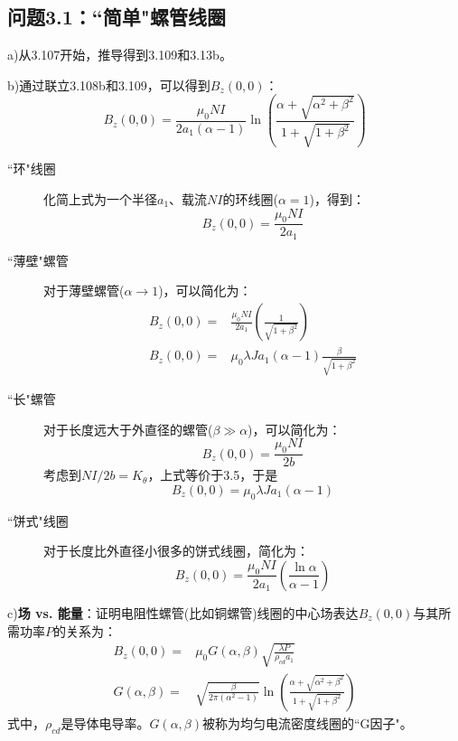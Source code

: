 \subsection{问题3.1：``简单"螺管线圈}
a)从3.107开始，推导得到3.109和3.13b。

b)通过联立3.108b和3.109，可以得到$B_z(0,0)$：
\begin{equation}
B_z(0,0)=\frac{\mu_0NI}{2a_1(\alpha-1)}\ln\left(\frac{\alpha+\sqrt{\alpha^2+\beta^2}}{1+\sqrt{1+\beta^2}}\right)%
\end{equation}

\begin{description}
  \item[``环"线圈] 化简上式为一个半径$a_1$、载流$NI$的环线圈($\alpha=1$)，得到：
  \begin{equation}
    B_z(0,0)=\frac{\mu_0NI}{2a_1}%
  \end{equation}
 \item[``薄壁"螺管] 对于薄壁螺管($\alpha \rightarrow 1$)，可以简化为：
 \begin{align*}
   B_z(0,0)=&\frac{\mu_0NI}{2a_1}\left(\frac{1}{\sqrt{1+\beta^2}}\right)\tag{3.111b}\\ %
   B_z(0,0)=&\mu_0 \lambda Ja_1(\alpha-1)\frac{\beta}{\sqrt{1+\beta^2}}\tag{3.111c}%
 \end{align*}
  \item[``长"螺管] 对于长度远大于外直径的螺管($\beta \gg \alpha$)，可以简化为：
\begin{equation*}
B_z(0,0)=\frac{\mu_0NI}{2b} \tag{3.111d}%
\end{equation*}
考虑到$NI/2b=K_\theta$，上式等价于3.5，于是
\begin{equation*}
B_z(0,0)=\mu_0\lambda Ja_1(\alpha-1) \tag{3.111e}%
\end{equation*}
  \item[``饼式"线圈] 对于长度比外直径小很多的饼式线圈，简化为：
  \begin{equation*}
B_z(0,0)=\frac{\mu_0NI}{2a_1}(\frac{\ln\alpha}{\alpha-1}) \tag{3.111f}%
  \end{equation*}
\end{description}

c)\textbf{场 vs. 能量}：证明电阻性螺管(比如铜螺管)线圈的中心场表达$B_z(0,0)$与其所需功率$P$的关系为：
\begin{subequations}
	\begin{align}
B_z(0,0)=&\mu_0G(\alpha,\beta)\sqrt{\frac{\lambda P}{\rho_{cd}a_1}}\\ %
G(\alpha,\beta)=&\sqrt{\frac{\beta}{2\pi(\alpha^2-1)}}\ln(\frac{\alpha+\sqrt{\alpha^2+\beta^2}}{1+\sqrt{1+\beta^2}})%
	\end{align}
\end{subequations}
式中，$\rho_{cd}$是导体电导率。$G(\alpha,\beta)$被称为均匀电流密度线圈的``G因子"。

